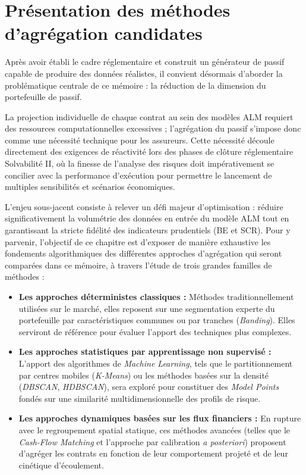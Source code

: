 \chapter{Présentation des méthodes d'agrégation candidates}

Après avoir établi le cadre réglementaire et construit un générateur de passif capable de produire des données réalistes, il convient désormais d'aborder la problématique centrale de ce mémoire : la réduction de la dimension du portefeuille de passif. 

La projection individuelle de chaque contrat au sein des modèles ALM requiert des ressources computationnelles excessives ; l'agrégation du passif s'impose donc comme une nécessité technique pour les assureurs. Cette nécessité découle directement des exigences de réactivité lors des phases de clôture réglementaire Solvabilité II, où la finesse de l'analyse des risques doit impérativement se concilier avec la performance d'exécution pour permettre le lancement de multiples sensibilités et scénarios économiques.

L'enjeu sous-jacent consiste à relever un défi majeur d'optimisation : réduire significativement la volumétrie des données en entrée du modèle ALM tout en garantissant la stricte fidélité des indicateurs prudentiels (BE et SCR). Pour y parvenir, l'objectif de ce chapitre est d'exposer de manière exhaustive les fondements algorithmiques des différentes approches d'agrégation qui seront comparées dans ce mémoire, à travers l'étude de trois grandes familles de méthodes :

\begin{itemize}
    \item \textbf{Les approches déterministes classiques :} Méthodes traditionnellement utilisées sur le marché, elles reposent sur une segmentation experte du portefeuille par caractéristiques communes ou par tranches (\textit{Banding}). Elles serviront de référence pour évaluer l'apport des techniques plus complexes.
    \item \textbf{Les approches statistiques par apprentissage non supervisé :} L'apport des algorithmes de \textit{Machine Learning}, tels que le partitionnement par centres mobiles (\textit{K-Means}) ou les méthodes basées sur la densité (\textit{DBSCAN}, \textit{HDBSCAN}), sera exploré pour constituer des \textit{Model Points} fondés sur une similarité multidimensionnelle des profils de risque.
    \item \textbf{Les approches dynamiques basées sur les flux financiers :} En rupture avec le regroupement spatial statique, ces méthodes avancées (telles que le \textit{Cash-Flow Matching} et l'approche par calibration \textit{a posteriori}) proposent d'agréger les contrats en fonction de leur comportement projeté et de leur cinétique d'écoulement.
\end{itemize}

